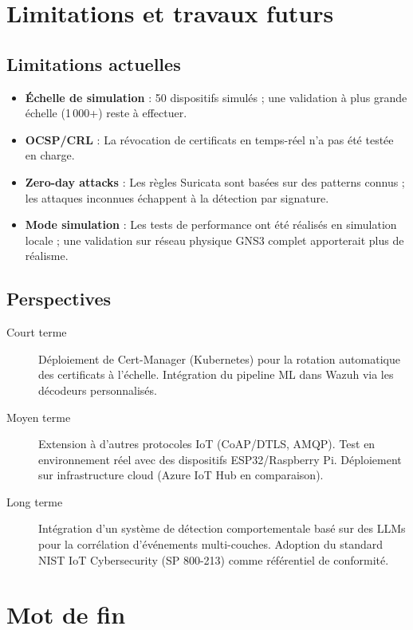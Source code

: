 \section{Limitations et travaux futurs}

\subsection{Limitations actuelles}

\begin{itemize}
  \item \textbf{Échelle de simulation} : 50 dispositifs simulés ; une validation à plus grande échelle (1\,000+) reste à effectuer.
  \item \textbf{OCSP/CRL} : La révocation de certificats en temps-réel n'a pas été testée en charge.
  \item \textbf{Zero-day attacks} : Les règles Suricata sont basées sur des patterns connus ; les attaques inconnues échappent à la détection par signature.
  \item \textbf{Mode simulation} : Les tests de performance ont été réalisés en simulation locale ; une validation sur réseau physique GNS3 complet apporterait plus de réalisme.
\end{itemize}

\subsection{Perspectives}

\begin{description}
  \item[Court terme] Déploiement de Cert-Manager (Kubernetes) pour la rotation automatique des certificats à l'échelle. Intégration du pipeline ML dans Wazuh via les décodeurs personnalisés.

  \item[Moyen terme] Extension à d'autres protocoles IoT (CoAP/DTLS, AMQP). Test en environnement réel avec des dispositifs ESP32/Raspberry Pi. Déploiement sur infrastructure cloud (Azure IoT Hub en comparaison).

  \item[Long terme] Intégration d'un système de détection comportementale basé sur des LLMs pour la corrélation d'événements multi-couches. Adoption du standard NIST IoT Cybersecurity (SP 800-213) comme référentiel de conformité.
\end{description}

\section{Mot de fin}

